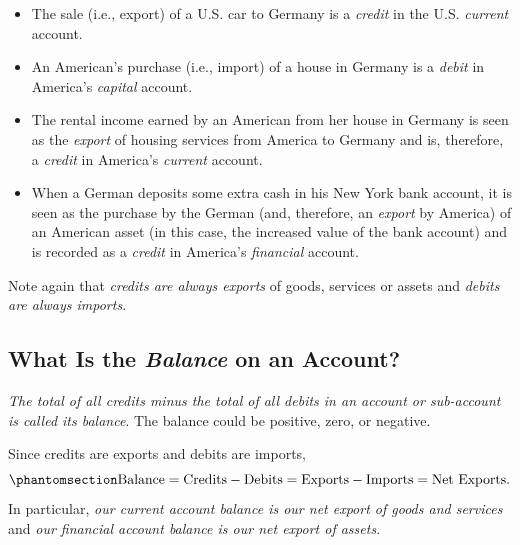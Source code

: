\documentclass[
  letterpaper,
]{book}
\providecommand{\tightlist}{%
  \setlength{\itemsep}{0pt}\setlength{\parskip}{0pt}}\usepackage{longtable,booktabs,array}
\begin{document}
\begin{itemize}
\tightlist
\item
  The sale (i.e., export) of a U.S. car to Germany is a \emph{credit} in
  the U.S. \emph{current} account.
\item
  An American's purchase (i.e., import) of a house in Germany is a
  \emph{debit} in America's \emph{capital} account.
\item
  The rental income earned by an American from her house in Germany is
  seen as the \emph{export} of housing services from America to Germany
  and is, therefore, a \emph{credit} in America's \emph{current}
  account.
\item
  When a German deposits some extra cash in his New York bank account,
  it is seen as the purchase by the German (and, therefore, an
  \emph{export} by America) of an American asset (in this case, the
  increased value of the bank account) and is recorded as a
  \emph{credit} in America's \emph{financial} account.
\end{itemize}

Note again that \emph{credits are always exports} of goods, services or
assets and \emph{debits are always imports}.

\subsection{\texorpdfstring{What Is the \emph{Balance} on an
Account?}{What Is the Balance on an Account?}}\label{sec-balance}

\emph{The total of all credits minus the total of all debits in an
account or sub-account is called its
balance}. The balance could be
positive, zero, or negative.

Since credits are exports and debits are imports,
\begin{equation}\phantomsection\label{eq-balancedef}{
\mbox{Balance} = \mbox{Credits} - \mbox{Debits} = \mbox{Exports} - \mbox{Imports} = \mbox{Net Exports}.
}\end{equation} In particular, \emph{our current account balance is our
net export of goods and services} and \emph{our financial account
balance is our net export of assets}.
\end{document}
